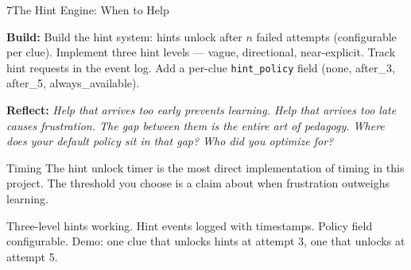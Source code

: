 \documentclass[
  11pt,
  oneside,
  DIV=12,
]{scrartcl}
\newcommand{\build}[1]{\textbf{\color{SpringMoss}Build:} #1}
\newcommand{\reflect}[1]{\textbf{\color{ConceptBlue}Reflect:} \textit{#1}}
\begin{document}
\begin{milestone}{7}{The Hint Engine: When to Help}

\build{Build the hint system: hints unlock after $n$ failed attempts
(configurable per clue). Implement three hint levels — vague, directional,
near-explicit. Track hint requests in the event log. Add a per-clue
\texttt{hint\_policy} field (none, after\_3, after\_5, always\_available).}

\medskip
\reflect{Help that arrives too early prevents learning. Help that arrives
too late causes frustration. The gap between them is the entire art of
pedagogy. Where does your default policy sit in that gap?
Who did you optimize for?}

\begin{hitlconcept}{Timing}
  The hint unlock timer is the most direct implementation of timing in
  this project. The threshold you choose is a claim about when frustration
  outweighs learning.
\end{hitlconcept}

\begin{checkpoint}
  Three-level hints working. Hint events logged with timestamps.
  Policy field configurable. Demo: one clue that unlocks hints at attempt 3,
  one that unlocks at attempt 5.
\end{checkpoint}

\end{milestone}
\end{document}
